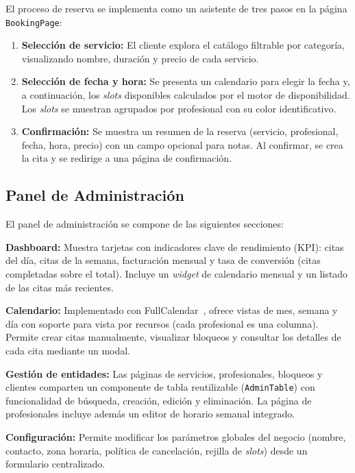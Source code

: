 El proceso de reserva se implementa como un asistente de tres pasos en la p\'agina \texttt{BookingPage}:

\begin{enumerate}
    \item \textbf{Selecci\'on de servicio:} El cliente explora el cat\'alogo filtrable por categor\'ia, visualizando nombre, duraci\'on y precio de cada servicio.
    \item \textbf{Selecci\'on de fecha y hora:} Se presenta un calendario para elegir la fecha y, a continuaci\'on, los \textit{slots} disponibles calculados por el motor de disponibilidad. Los \textit{slots} se muestran agrupados por profesional con su color identificativo.
    \item \textbf{Confirmaci\'on:} Se muestra un resumen de la reserva (servicio, profesional, fecha, hora, precio) con un campo opcional para notas. Al confirmar, se crea la cita y se redirige a una p\'agina de confirmaci\'on.
\end{enumerate}

\subsection{Panel de Administraci\'on}\label{subsec:panel-admin}

El panel de administraci\'on se compone de las siguientes secciones:

\textbf{Dashboard:} Muestra tarjetas con indicadores clave de rendimiento (KPI): citas del d\'ia, citas de la semana, facturaci\'on mensual y tasa de conversi\'on (citas completadas sobre el total). Incluye un \textit{widget} de calendario mensual y un listado de las citas m\'as recientes.

\textbf{Calendario:} Implementado con FullCalendar~\cite{fullcalendar}, ofrece vistas de mes, semana y d\'ia con soporte para vista por recursos (cada profesional es una columna). Permite crear citas manualmente, visualizar bloqueos y consultar los detalles de cada cita mediante un modal.

\textbf{Gesti\'on de entidades:} Las p\'aginas de servicios, profesionales, bloqueos y clientes comparten un componente de tabla reutilizable (\texttt{AdminTable}) con funcionalidad de b\'usqueda, creaci\'on, edici\'on y eliminaci\'on. La p\'agina de profesionales incluye adem\'as un editor de horario semanal integrado.

\textbf{Configuraci\'on:} Permite modificar los par\'ametros globales del negocio (nombre, contacto, zona horaria, pol\'itica de cancelaci\'on, rejilla de \textit{slots}) desde un formulario centralizado.

